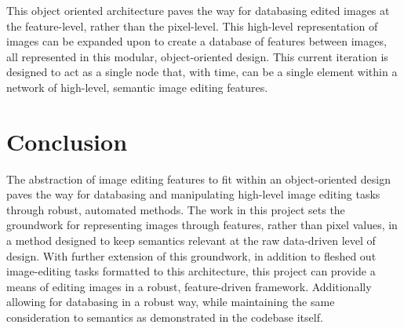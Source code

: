 \documentclass[sigchi]{acmart}
\begin{document}
This object oriented architecture paves the way for databasing edited images at the feature-level, rather than the pixel-level. This high-level representation of images can be expanded upon to create a database of features between images, all represented in this modular, object-oriented design. This current iteration is designed to act as a single node that, with time, can be a single element within a network of high-level, semantic image editing features.


\section{Conclusion}

The abstraction of image editing features to fit within an object-oriented design paves the way for databasing and manipulating high-level image editing tasks through robust, automated methods. The work in this project sets the groundwork for representing images through features, rather than pixel values, in a method designed to keep semantics relevant at the raw data-driven level of design. With further extension of this groundwork, in addition to fleshed out image-editing tasks formatted to this architecture, this project can provide a means of editing images in a robust, feature-driven framework. Additionally allowing for databasing in a robust way, while maintaining the same consideration to semantics as demonstrated in the codebase itself.

\nocite{*}


\end{document}
